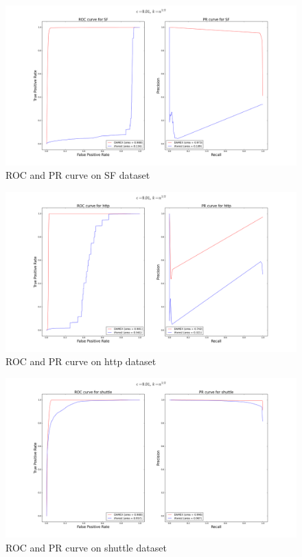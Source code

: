 \documentclass[9pt]{beamer}
\begin{document}
\begin{frame}
\begin{figure}[H]
  \centering
  \includegraphics[width = 1. \textwidth]{SF-4d-lb-semi-supervised-average-rect-01}
  \caption{ROC and PR curve on SF dataset}
  \label{SF}
\end{figure}
\end{frame}



\begin{frame}
\begin{figure}[H]
  \centering
  \includegraphics[width = 1. \textwidth]{http-3d-semi-supervised-average-rect-01}
  \caption{ROC and PR curve on http dataset}
  \label{http}
\end{figure}
\end{frame}


\begin{frame}
\begin{figure}[H]
  \centering
  \includegraphics[width = 1. \textwidth]{shuttle-semi-supervised-average-rect-01}
  \caption{ROC and PR curve on shuttle dataset}
  \label{shuttle}
\end{figure}
\end{frame}
\end{document}
